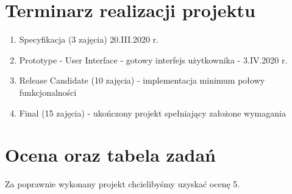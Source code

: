 \documentclass[12pt, a4paper, oneside]{article}
\begin{document}
\section{Terminarz realizacji projektu}
\begin{enumerate}[label=\Roman*.]
    \item Specyfikacja (3 zajęcia)  20.III.2020 r. 
    \item Prototype - User Interface  - gotowy interfejs użytkownika - 3.IV.2020 r.
    \item Release Candidate (10 zajęcia) - implementacja minimum połowy funkcjonalności
    \item Final (15 zajęcia) - ukończony projekt spełniający założone wymagania
\end{enumerate}

\section{Ocena oraz tabela zadań}


Za poprawnie wykonany projekt chcielibyśmy uzyskać ocenę 5.
\end{document}
